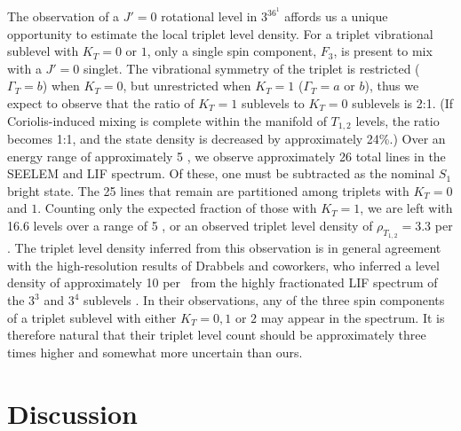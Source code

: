 \documentclass[12pt]{mitthesis}
\begin{document}
The observation of a $J'=0$ rotational level in $3^36^1$ 
affords us a unique opportunity to estimate the local triplet level
density.  For a triplet vibrational sublevel with $K_T=0$ or $1$, only
a single spin component, $F_3$, is present to mix with a $J'=0$
singlet.  The vibrational symmetry of the triplet is restricted
($\Gamma_T=b$) when $K_T=0$, but unrestricted when $K_T=1$
($\Gamma_T=a$ or $b$), thus we expect to observe that the ratio of
$K_T=1$ sublevels to $K_T=0$ sublevels is 2:1.  (If Coriolis-induced
mixing is complete within the manifold of $T_{1,2}$ levels, the ratio
becomes 1:1, and the state density is decreased by approximately
24\%.)  Over an energy range of approximately 5 \rcm, we observe
approximately 26 total lines in the SEELEM and LIF spectrum.  Of
these, one must be subtracted as the nominal $S_1$ bright state.  The
25 lines that remain are partitioned among triplets with $K_T=0$ and
$1$.  Counting only the expected fraction of those with $K_T=1$, we
are left with 16.6 levels over a range of 5 \rcm, or an observed
triplet level density of $\rho_{T_{1,2}} = 3.3$ per \rcm.  The triplet
level density inferred from this observation is in general agreement
with the high-resolution results of Drabbels and coworkers, who
inferred a level density of approximately 10 per \rcm\ from the highly
fractionated LIF spectrum of the $3^3$  and $3^4$ 
sublevels \cite{drabbels94}.  In their observations, any of the three
spin components of a triplet sublevel with either $K_T=0, 1$ or $2$
may appear in the spectrum.  It is therefore natural that their
triplet level count should be approximately three times higher and
somewhat more uncertain than ours.



\section{Discussion}

\end{document}
